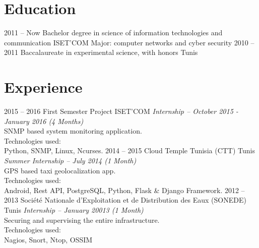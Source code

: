 \documentclass[]{friggeri-cv}
\begin{document}
\section{Education}

\begin{entrylist}
\entry
{2011 -- Now}
{Bachelor degree {\normalfont in science of information technologies and communication}}
{ISET'COM}
{Major: computer networks and cyber security}
\entry
{2010 -- 2011}
{Baccalaureate {\normalfont in experimental science, with honors}}
{Tunis}
{}
\end{entrylist}


\section{Experience}

\begin{entrylist}
\entry
{2015 – 2016}
{First Semester Project}
{ISET'COM}
{\emph{Internship – October 2015 - January 2016 (4 Months)\\}
SNMP based system monitoring application.\\
Technologies used:\\
Python, SNMP, Linux, Ncurses.}
\entry
{2014 – 2015}
{Cloud Temple Tunisia (CTT)}
{Tunis}
{\emph{Summer Internship – July 2014 (1 Month)}\\
GPS based taxi geolocalization app.\\
Technologies used:\\
Android, Rest API, PostgreSQL, Python, Flask \& Django Framework.}
\entry
{2012 – 2013}
{Société Nationale d’Exploitation et de Distribution des Eaux (SONEDE)}
{Tunis}
{\emph{Internship – January 20013 (1 Month)} \\
Securing and supervising the entire infrastructure.\\
Technologies used:\\
Nagios, Snort, Ntop, OSSIM}
\end{entrylist}
\end{document}
